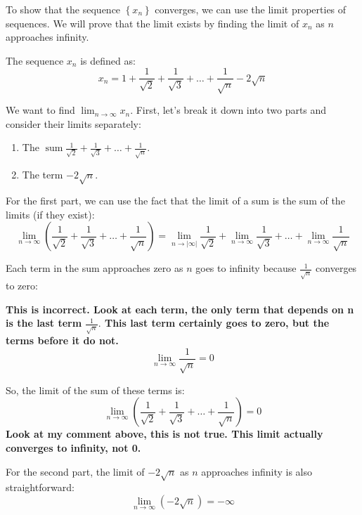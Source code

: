 \documentclass{report}
\begin{document}
\bigskip
{}


To show that the sequence $\left\{x_n\right\}$ converges, we can use the limit properties of sequences. We will prove that the limit exists by finding the limit of $x_n$ as $n$ approaches infinity.

The sequence $x_n$ is defined as:
$$
x_n=1+\frac{1}{\sqrt{2}}+\frac{1}{\sqrt{3}}+\ldots+\frac{1}{\sqrt{n}}-2 \sqrt{n}
$$

We want to find $\lim _{n \rightarrow \infty} x_n$. First, let's break it down into two parts and consider their limits separately:



\begin{enumerate}

  \item The $\operatorname{sum} \frac{1}{\sqrt{2}}+\frac{1}{\sqrt{3}}+\ldots+\frac{1}{\sqrt{n}}$.
    \item The term $-2 \sqrt{n}$.
    
\end{enumerate}

For the first part, we can use the fact that the limit of a sum is the sum of the limits (if they exist):
$$
\lim _{n \rightarrow \infty}\left(\frac{1}{\sqrt{2}}+\frac{1}{\sqrt{3}}+\ldots+\frac{1}{\sqrt{n}}\right)=\lim _{n \rightarrow|\infty|} \frac{1}{\sqrt{2}}+\lim _{n \rightarrow \infty} \frac{1}{\sqrt{3}}+\ldots+\lim _{n \rightarrow \infty} \frac{1}{\sqrt{n}}
$$

Each term in the sum approaches zero as $n$ goes to infinity because $\frac{1}{\sqrt{n}}$ converges to zero:

\textbf{This is incorrect. Look at each term, the only term that depends on n is the last term $\frac{1}{\sqrt{n}}.$ This last term certainly goes to zero, but the terms before it do not. }
$$
\lim _{n \rightarrow \infty} \frac{1}{\sqrt{n}}=0
$$

So, the limit of the sum of these terms is:
$$
\lim _{n \rightarrow \infty}\left(\frac{1}{\sqrt{2}}+\frac{1}{\sqrt{3}}+\ldots+\frac{1}{\sqrt{n}}\right)=0
$$
\textbf{Look at my comment above, this is not true. This limit actually converges to infinity, not 0.}

For the second part, the limit of $-2 \sqrt{n}$ as $n$ approaches infinity is also straightforward:
$$
\lim _{n \rightarrow \infty}(-2 \sqrt{n})=-\infty
$$
\end{document}
